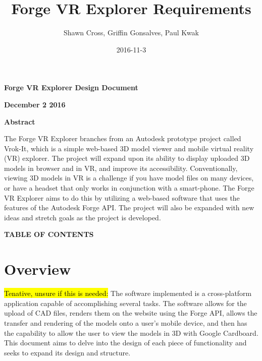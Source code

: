 \documentclass[letterpaper, 10pt, draftclsnofoot, compsoc, onecolumn]{IEEEtran}
\title{Forge VR Explorer Requirements}
\author{Shawn Cross, Griffin Gonsalves, Paul Kwak}
\date{2016-11-3}
\begin{document}
\clearpage\setcounter{page}{1}\pagestyle{Standard}
\thispagestyle{FirstPage}

\bigskip

{\centering{}\bfseries\color{black}
Forge VR Explorer Design Document
\par}


\bigskip

{\centering{}\bfseries\color{black}
December 2 2016
\par}
\bigskip
\bigskip
\bigskip
\bigskip
\bigskip
\bigskip
\bigskip
\bigskip
\bigskip
\bigskip
\bigskip
\bigskip


\vfill
{\centering{}\bfseries\color{black}
Abstract
\par}

{\centering{}\mdseries\color{black}
	The Forge VR Explorer branches from an Autodesk prototype project called Vrok-It, which is a simple web-based 3D 
	model viewer and mobile virtual reality (VR) explorer. The project will expand upon its ability to display uploaded 3D 
	models in browser and in VR, and improve its accessibility. Conventionally, viewing 3D models in VR is a challenge if 
	you have model files on many devices, or have a headset that only works in conjunction with a smart-phone. The 
	Forge VR Explorer aims to do this by utilizing a web-based software that uses the features of the Autodesk Forge API. 
	The project will also be expanded with new ideas and stretch goals as the project is developed.
\par}
\clearpage
{\centering{}\bfseries\color{black}
TABLE OF CONTENTS
\par}

\bigskip

\setcounter{tocdepth}{2}
\renewcommand\contentsname{}
\tableofcontents

\bigskip
\clearpage


\section{Overview}
	\hl{Tenative, unsure if this is needed:} The software implemented is a cross-platform application capable of accomplishing several tasks. The software allows for the upload of CAD files, renders them on the website using the Forge API, allows the transfer and rendering of the models onto a user's mobile device, and then has the capability to allow the user to view the models in 3D with Google Cardboard. This document aims to delve into the design of each piece of functionality and seeks to expand its design and structure.
\end{document}
